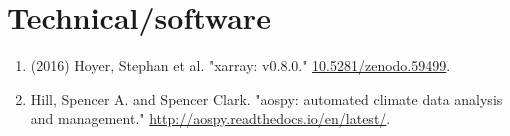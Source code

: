 \documentclass[12pt,letterpaper]{shillcv}
\begin{document}
\section*{Technical/software}
\label{sec:org8a6ccf2}
\begin{enumerate}
\item (2016) Hoyer, Stephan et al.  "xarray: v0.8.0."  \href{https://doi.org/10.5281/zenodo.59499}{10.5281/zenodo.59499}.
\item Hill, Spencer A. and Spencer Clark.  "aospy: automated climate data analysis
and management."  \url{http://aospy.readthedocs.io/en/latest/}.
\end{enumerate}
\end{document}
